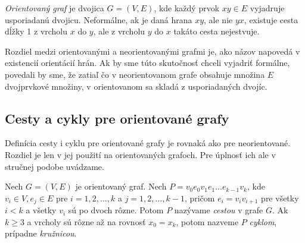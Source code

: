 \textit{Orientovaný graf} je dvojica $G = (V, E)$, kde každý prvok $xy \in E$ vyjadruje usporiadanú dvojicu. Neformálne, ak je daná hrana $xy$, ale nie $yx$, existuje cesta dĺžky 1 z vrcholu $x$ do $y$, ale z vrcholu $y$ do $x$ takáto cesta nejestvuje.\newline

Rozdiel medzi orientovanými a neorientovanými grafmi je, ako názov napovedá v existencií orientácií hrán. Ak by sme túto skutočnosť chceli vyjadriť formálne, povedali by sme, že zatiaľ čo v neorientovanom grafe obsahuje množina $E$ dvojprvkové množiny, v orientovanom sa skladá z usporiadaných dvojíc.\newline


\subsection{Cesty a cykly pre orientované grafy}

Definícia cesty i cyklu pre orientované grafy je rovnaká ako pre neorientované. Rozdiel je len v jej použití na orientovaných grafoch. Pre úplnosť ich ale v stručnej podobe uvádzame.\newline

Nech $G = (V, E)$ je orientovaný graf. Nech $P = v_{0}e_{0}v_{1}e_{1} ... e_{k-1}v_{k}$, kde $ v_{i} \in V, e_{j} \in E$ pre $i = 1, 2, ..., k$ a $j = 1, 2, ..., k-1$, pričom $e_{i} = v_{i}v_{i+1}$ pre všetky $i < k$ a  všetky $v_{i}$ sú po dvoch rôzne. Potom $P$ nazývame \textit{cestou} v grafe $G$. Ak $k\geq 3$ a vrcholy sú rôzne až na rovnosť $x_{0} = x_{k}$, potom nazveme $P$ \textit{cyklom}, prípadne \textit{kružnicou}. \cite[kapitola 1.4]{bang2008digraphs}



